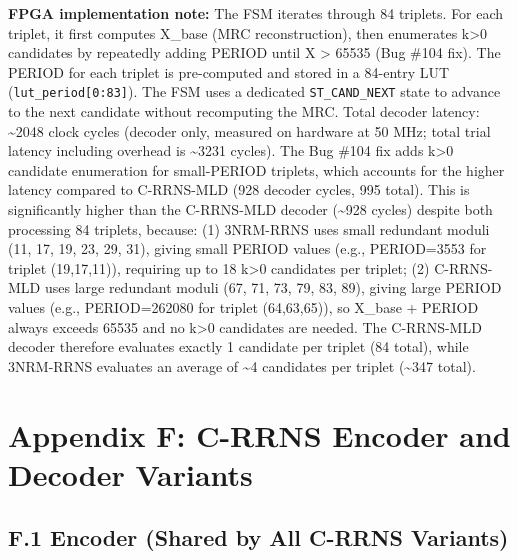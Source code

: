 \documentclass[
  english,
  12pt,
]{report}
\begin{document}
\textbf{FPGA implementation note:} The FSM iterates through 84 triplets.
For each triplet, it first computes X\_base (MRC reconstruction), then
enumerates k\textgreater0 candidates by repeatedly adding PERIOD until X
\textgreater{} 65535 (Bug \#104 fix). The PERIOD for each triplet is
pre-computed and stored in a 84-entry LUT
(\texttt{lut\_period{[}0:83{]}}). The FSM uses a dedicated
\texttt{ST\_CAND\_NEXT} state to advance to the next candidate without
recomputing the MRC. Total decoder latency: \textasciitilde2048 clock
cycles (decoder only, measured on hardware at 50 MHz; total trial
latency including overhead is \textasciitilde3231 cycles). The Bug \#104
fix adds k\textgreater0 candidate enumeration for small-PERIOD triplets,
which accounts for the higher latency compared to C-RRNS-MLD (928
decoder cycles, 995 total). This is significantly higher than the
C-RRNS-MLD decoder (\textasciitilde928 cycles) despite both processing
84 triplets, because: (1) 3NRM-RRNS uses small redundant moduli (11, 17,
19, 23, 29, 31), giving small PERIOD values (e.g., PERIOD=3553 for
triplet (19,17,11)), requiring up to 18 k\textgreater0 candidates per
triplet; (2) C-RRNS-MLD uses large redundant moduli (67, 71, 73, 79, 83,
89), giving large PERIOD values (e.g., PERIOD=262080 for triplet
(64,63,65)), so X\_base + PERIOD always exceeds 65535 and no
k\textgreater0 candidates are needed. The C-RRNS-MLD decoder therefore
evaluates exactly 1 candidate per triplet (84 total), while 3NRM-RRNS
evaluates an average of \textasciitilde4 candidates per triplet
(\textasciitilde347 total).

\section{Appendix F: C-RRNS Encoder and Decoder
Variants}\label{appendix-f-c-rrns-encoder-and-decoder-variants}

\subsection{F.1 Encoder (Shared by All C-RRNS
Variants)}\label{f.1-encoder-shared-by-all-c-rrns-variants}
\end{document}
